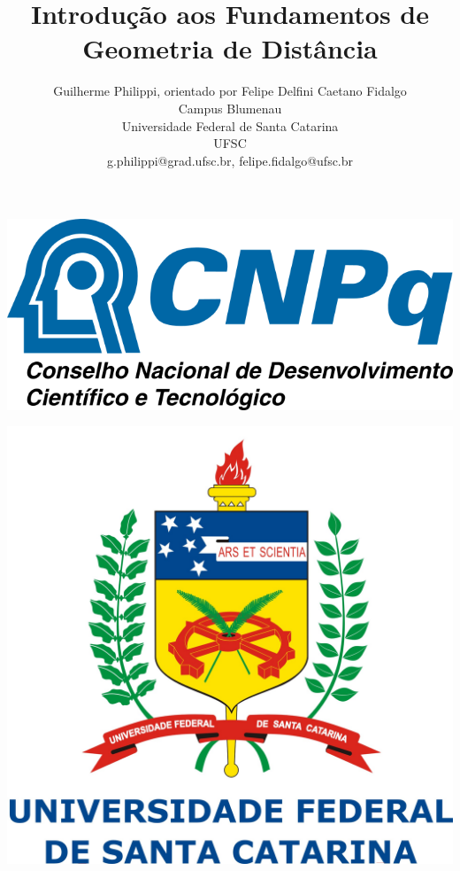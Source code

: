 \documentclass[a4paper,12pt]{report}
\title{Introdução aos Fundamentos de Geometria de Distância}
\author{Guilherme Philippi\Mark{*}, orientado por Felipe Delfini Caetano Fidalgo\Mark{\dagger}\\Campus Blumenau\\Universidade Federal de Santa Catarina\\UFSC
	\\g.philippi@grad.ufsc.br\Mark{*}, felipe.fidalgo@ufsc.br\Mark{\dagger}}
\theoremstyle{plain}
\theoremstyle{definition}
\begin{document}
	\begin{titlepage}
		\newcommand{\HRule}{\rule{\linewidth}{0.5mm}} %
		\center %
		\begin{flushright}
			\includegraphics[scale=0.35]{figures/cnpq-logo.png}	
		\end{flushright}
		\vspace{-2cm}
		\begin{center}
			\includegraphics[scale=0.22]{figures/logoufsc.jpg}
		\end{center}
		\vspace{1cm}
		

\end{titlepage}
\end{document}
